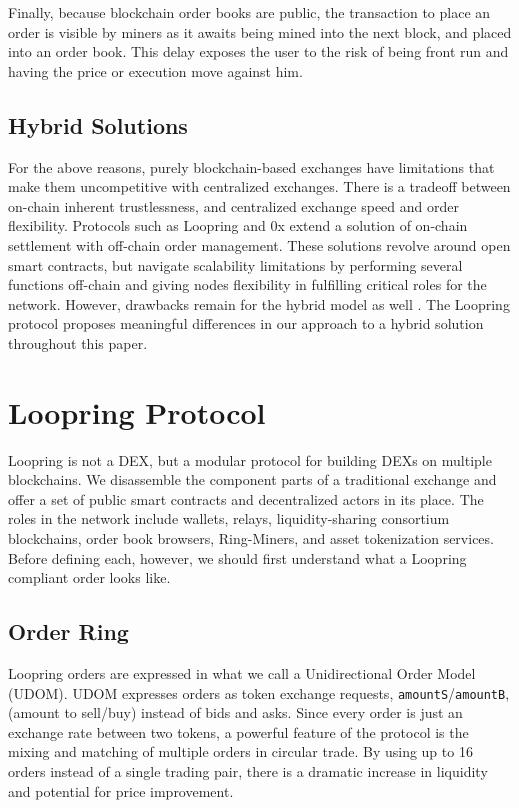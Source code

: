 \documentclass[UTF8,nofonts]{article}
\begin{document}
\begin{multicols}{2}
Finally, because blockchain order books are public, the transaction to place an order is visible by miners as it awaits being mined into the next block, and placed into an order book. This delay exposes the user to the risk of being front run and having the price or execution move against him.

\subsection{Hybrid Solutions}
For the above reasons, purely blockchain-based exchanges have limitations that make them uncompetitive with centralized exchanges. There is a tradeoff between on-chain inherent trustlessness, and centralized exchange speed and order flexibility. Protocols such as Loopring and 0x \cite{warren20170x} extend a solution of on-chain settlement with off-chain order management. These solutions revolve around open smart contracts, but navigate scalability limitations by performing several functions off-chain and giving nodes flexibility in fulfilling critical roles for the network. However, drawbacks remain for the hybrid model as well \cite{costofdecent}. The Loopring protocol proposes meaningful differences in our approach to a hybrid solution throughout this paper.


\section{Loopring Protocol\label{sec:loopring_protocol}}
Loopring is not a DEX, but a modular protocol for building DEXs on multiple blockchains. We disassemble the component parts of a traditional exchange and offer a set of public smart contracts and decentralized actors in its place. The roles in the network include wallets, relays, liquidity-sharing consortium blockchains, order book browsers, Ring-Miners, and asset tokenization services. Before defining each, however, we should first understand what a Loopring compliant order looks like. 

\subsection{Order Ring\label{sec:order_ring}}
Loopring orders are expressed in what we call a Unidirectional Order Model (UDOM)\cite{coinport2014udom}. UDOM expresses orders as token exchange requests, \verb|amountS|/\verb|amountB|, (amount to sell/buy)  instead of bids and asks. Since every order is just an exchange rate between two tokens, a powerful feature of the protocol is the mixing and matching of multiple orders in circular trade. By using up to 16 orders instead of a single trading pair, there is a dramatic increase in liquidity and potential for price improvement. 


\end{multicols}
\end{document}

